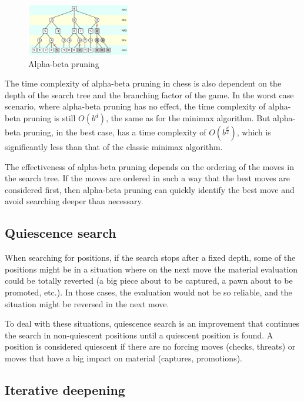 \begin{figure}[h]
    \centering
    \includegraphics[width=0.4\textwidth]{figures/alpha-beta-pruning.png}
    \caption{Alpha-beta pruning}
    \label{fig:alphaBetaPruning}
\end{figure}

The time complexity of alpha-beta pruning in chess is also dependent on the depth of the search tree and the branching factor of the game. In the worst case scenario, where alpha-beta pruning has no effect, the time complexity of alpha-beta pruning is still $O(b^{d})$, the same as for the minimax algorithm. But alpha-beta pruning, in the best case, has a time complexity of $O(b^{\frac{d}{2}})$, which is significantly less than that of the classic minimax algorithm.

The effectiveness of alpha-beta pruning depends on the ordering of the moves in the search tree. If the moves are ordered in such a way that the best moves are considered first, then alpha-beta pruning can quickly identify the best move and avoid searching deeper than necessary.

\subsection{Quiescence search}
\label{subsec:ch2sec2subsec3}

When searching for positions, if the search stops after a fixed depth, some of the positions might be in a situation where on the next move the material evaluation could be totally reverted (a big piece about to be captured, a pawn about to be promoted, etc.). In those cases, the evaluation would not be so reliable, and the situation might be reversed in the next move.

To deal with these situations, quiescence search is an improvement that continues the search in non-quiescent positions until a quiescent position is found. A position is considered quiescent if there are no forcing moves (checks, threats) or moves that have a big impact on material (captures, promotions).


\subsection{Iterative deepening}
\label{subsec:ch2sec2subsec4}

